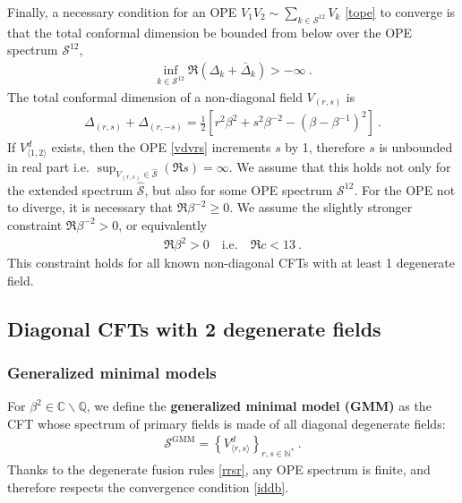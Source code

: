 \documentclass[12pt, a4paper]{article}
\newcommand{\myindex}[1]{\textbf{\boldmath #1}}
\begin{document}
Finally, a necessary condition for an OPE $V_1V_2\sim \sum_{k\in\mathcal{S}^{12}}V_k$ \eqref{tope} to converge is that the total conformal dimension be bounded from below over the OPE spectrum $\mathcal{S}^{12}$,
\begin{align}
 \boxed{\inf_{k\in \mathcal{S}^{12}}\Re\left(\Delta_k+\bar\Delta_k\right) > -\infty} \ . 
 \label{iddb}
\end{align}
The total conformal dimension of a non-diagonal field $V_{(r,s)}$ is 
\begin{align}
 \Delta_{(r,s)}+\Delta_{(r,-s)} = \frac12\left[ r^2\beta^{2} + s^2\beta^{-2}  -\left(\beta-\beta^{-1}\right)^2\right]\ .
\end{align}
If $V^d_{\langle 1,2\rangle}$ exists, then the OPE \eqref{vdvrs} increments $s$ by 1, therefore $s$ is unbounded in real part i.e. $\sup_{V_{(r,s)}\in \widehat{\mathcal{S}}} \left(\Re s\right) = \infty$. We assume that this holds not only for the extended spectrum $\widehat{\mathcal{S}}$, but also for some OPE spectrum $\mathcal{S}^{12}$. For the OPE not to diverge, it is necessary that $\Re\beta^{-2}\geq 0$. We assume the slightly stronger constraint $\Re\beta^{-2}> 0$, or equivalently
\begin{align}
 \boxed{\Re\beta^2 > 0 \quad \text{i.e.} \quad \Re c < 13}\ .
 \label{rbp}
\end{align}
This constraint holds for all known non-diagonal CFTs with at least 1 degenerate field.

\subsection{Diagonal CFTs with 2 degenerate fields}\label{sec:diag}

\subsubsection{Generalized minimal models}\label{sec:gmm}

For $\beta^2\in\mathbb{C}\backslash\mathbb{Q}$, we define the \myindex{generalized minimal model (GMM)} as the CFT whose spectrum of primary fields is made of all diagonal degenerate fields:
\begin{align}
 \boxed{\mathcal{S}^\text{GMM} = \left\{ V^d_{\langle r,s\rangle}\right\}_{r,s\in\mathbb{N}^*}} \ . 
\end{align}
Thanks to the degenerate fusion rules \eqref{rrsr}, any OPE spectrum is finite, and therefore respects the convergence condition \eqref{iddb}.
\end{document}
